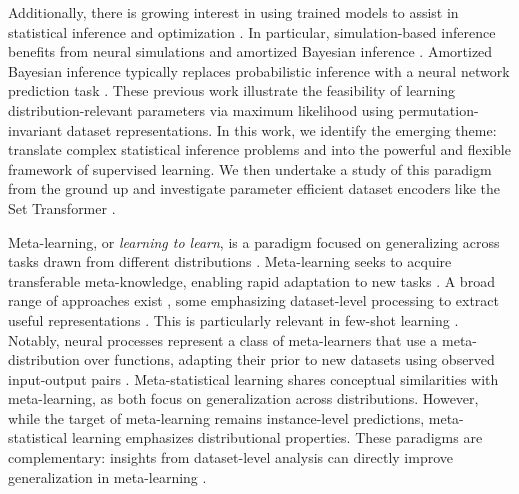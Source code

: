 Additionally, there is growing interest in using trained models to assist in statistical inference \cite{angelopoulos2023predictionpoweredinference} and optimization \cite{NIPS2017_addfa9b7, NEURIPS2020_f52db9f7, NEURIPS2021_56c3b2c6, amos2023tutorialamortizedoptimization}. In particular, simulation-based inference benefits from neural simulations \cite{pmlr-v89-papamakarios19a, cranmer2020frontier} and amortized Bayesian inference \cite{gonccalves2020training, elsemueller2024sensitivity, radev2020bayesflow, avecilla2022neural, pmlr-v235-gloeckler24a}. Amortized Bayesian inference typically replaces probabilistic inference with a neural network prediction task \cite{chan2018likelihood, chen2023learning, chen2020neural}. These previous work illustrate the feasibility of learning distribution-relevant parameters via maximum likelihood using permutation-invariant dataset representations. In this work, we identify the emerging theme: translate complex statistical inference problems and into the powerful and flexible framework of supervised learning. We then undertake a study of this paradigm from the ground up and investigate parameter efficient dataset encoders like the Set Transformer \cite{lee2019set,zhang2022set}.

Meta-learning, or \textit{learning to learn}, is a paradigm focused on generalizing across tasks drawn from different distributions \cite{schmidhuber1996simple, hospedales2021meta, huisman2021survey}. Meta-learning seeks to acquire transferable meta-knowledge, enabling rapid adaptation to new tasks \cite{schmidhuber1987evolutionary, thrun1998lifelong, schmidhuber1993neural, vanschoren2019meta}. A broad range of approaches exist \cite{vinyals2016matching, santoro2016meta, finn2017model, snell2017prototypical}, some emphasizing dataset-level processing to extract useful representations \cite{mishra2017simple, ravi2017optimization, munkhdalai2017meta, shyam2017attentive}. This is particularly relevant in few-shot learning \cite{finn2017model, snell2017prototypical, wang2023few, wu2020meta, rivolli2022meta}. 
Notably, neural processes represent a class of meta-learners that use a meta-distribution over functions, adapting their prior to new datasets using observed input-output pairs \cite{garnelo2018neural, garnelo2018conditional, kim2019attentive}.
% 
Meta-statistical learning shares conceptual similarities with meta-learning, as both focus on generalization across distributions. However, while the target of meta-learning remains instance-level predictions, meta-statistical learning emphasizes distributional properties. These paradigms are complementary: insights from dataset-level analysis can directly improve generalization in meta-learning \cite{jomaa2021dataset2vec, kotlar2021novel, kobalczyk2025automatedknowledgeintegrationhumaninterpretable}.